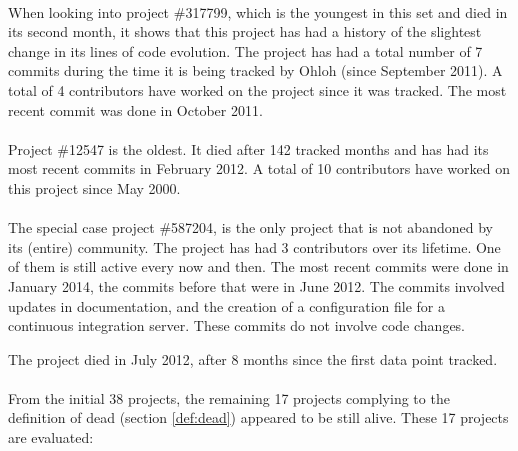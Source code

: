 \paragraph{}
When looking into project \#317799, which is the youngest in this set and died
in its second month, it shows that this project has had a history of the slightest
change in its lines of code evolution. The project has had a total number of 7
commits during the time it is being tracked by Ohloh (since September 2011). A
total of 4 contributors have worked on the project since it was tracked. The
most recent commit was done in October 2011.

\paragraph{}
Project \#12547 is the oldest. It died after 142 tracked months and has
had its most recent commits in February 2012. A total of 10 contributors have
worked on this project since May 2000.

\paragraph{}
The special case project \#587204, is the only project that is not
abandoned by its (entire) community. The project has had 3 contributors over its
lifetime. One of them is still active every now and then. The most recent
commits were done in January 2014, the commits before that were in June 2012.
The commits involved updates in documentation, and the creation of a
configuration file for a continuous integration server. These commits do not
involve code changes.

The project died in July 2012, after 8 months since the first data point
tracked.

\paragraph{}
From the initial 38 projects, the remaining 17 projects complying to the
definition of dead (section \ref{def:dead}) appeared to be still alive. These
17 projects are evaluated:

